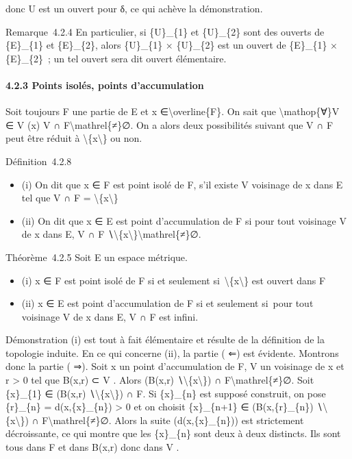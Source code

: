 \documentclass[]{article}
\begin{document}
donc U est un ouvert pour δ, ce qui achève la démonstration.

Remarque~4.2.4 En particulier, si \{U\}\_\{1\} et \{U\}\_\{2\} sont des
ouverts de \{E\}\_\{1\} et \{E\}\_\{2\}, alors \{U\}\_\{1\} ×
\{U\}\_\{2\} est un ouvert de \{E\}\_\{1\} × \{E\}\_\{2\}~; un tel
ouvert sera dit ouvert élémentaire.

\paragraph{4.2.3 Points isolés, points d'accumulation}

Soit toujours F une partie de E et x ∈\textbackslash{}overline\{F\}. On
sait que \textbackslash{}mathop\{∀\}V ∈ V (x) V ∩
F\textbackslash{}mathrel\{≠\}∅. On a alors deux possibilités suivant que
V ∩ F peut être réduit à \textbackslash{}\{x\textbackslash{}\} ou non.

Définition~4.2.8

\begin{itemize}
\itemsep1pt\parskip0pt
\item
  (i) On dit que x ∈ F est point isolé de F, s'il existe V voisinage de
  x dans E tel que V ∩ F = \textbackslash{}\{x\textbackslash{}\}
\item
  (ii) On dit que x ∈ E est point d'accumulation de F si pour tout
  voisinage V de x dans E, V ∩ F
  ∖\textbackslash{}\{x\textbackslash{}\}\textbackslash{}mathrel\{≠\}∅.
\end{itemize}

Théorème~4.2.5 Soit E un espace métrique.

\begin{itemize}
\itemsep1pt\parskip0pt
\item
  (i) x ∈ F est point isolé de F si et seulement
  si~\textbackslash{}\{x\textbackslash{}\} est ouvert dans F
\item
  (ii) x ∈ E est point d'accumulation de F si et seulement si~pour tout
  voisinage V de x dans E, V ∩ F est infini.
\end{itemize}

Démonstration (i) est tout à fait élémentaire et résulte de la
définition de la topologie induite. En ce qui concerne (ii), la partie (
⇐) est évidente. Montrons donc la partie ( ⇒). Soit x un point
d'accumulation de F, V un voisinage de x et r \textgreater{} 0 tel que
B(x,r) ⊂ V . Alors (B(x,r) ∖\textbackslash{}\{x\textbackslash{}\}) ∩
F\textbackslash{}mathrel\{≠\}∅. Soit \{x\}\_\{1\} ∈ (B(x,r)
∖\textbackslash{}\{x\textbackslash{}\}) ∩ F. Si \{x\}\_\{n\} est supposé
construit, on pose \{r\}\_\{n\} = d(x,\{x\}\_\{n\}) \textgreater{} 0 et
on choisit \{x\}\_\{n+1\} ∈ (B(x,\{r\}\_\{n\})
∖\textbackslash{}\{x\textbackslash{}\}) ∩
F\textbackslash{}mathrel\{≠\}∅. Alors la suite (d(x,\{x\}\_\{n\})) est
strictement décroissante, ce qui montre que les \{x\}\_\{n\} sont deux à
deux distincts. Ils sont tous dans F et dans B(x,r) donc dans V .
\end{document}
